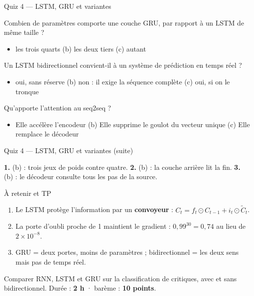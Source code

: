 \begin{frame}{Quiz 4 --- LSTM, GRU et variantes}
\begin{qbox}[Question 1]
Combien de paramètres comporte une couche GRU, par rapport à un LSTM de même
taille ?
\begin{itemize}
  \item[(a)] les trois quarts \quad (b) les deux tiers \quad (c) autant
\end{itemize}
\end{qbox}
\begin{qbox}[Question 2]
Un LSTM bidirectionnel convient-il à un système de prédiction en temps réel ?
\begin{itemize}
  \item[(a)] oui, sans réserve \quad (b) non : il exige la séquence complète
  \quad (c) oui, si on le tronque
\end{itemize}
\end{qbox}
\begin{qbox}[Question 3]
Qu'apporte l'attention au seq2seq ?
\begin{itemize}
  \item[(a)] Elle accélère l'encodeur \quad (b) Elle supprime le goulot du
  vecteur unique \quad (c) Elle remplace le décodeur
\end{itemize}
\end{qbox}

\end{frame}
\begin{frame}{Quiz 4 --- LSTM, GRU et variantes (suite)}
\begin{solbox}[Réponses]
\textbf{1.} (b) : trois jeux de poids contre quatre. \quad
\textbf{2.} (b) : la couche arrière lit la fin. \quad
\textbf{3.} (b) : le décodeur consulte tous les pas de la source.
\end{solbox}
\end{frame}

\begin{frame}{À retenir et TP}
\begin{kbox}
\begin{enumerate}
  \item Le LSTM protège l'information par un \textbf{convoyeur} :
  $C_t = f_t \odot C_{t-1} + i_t \odot \tilde{C}_t$.
  \item La porte d'oubli proche de 1 maintient le gradient : $0{,}99^{30}
  = 0{,}74$ au lieu de $2 \times 10^{-8}$.
  \item GRU = deux portes, moins de paramètres ; bidirectionnel = les deux sens
  mais pas de temps réel.
\end{enumerate}
\end{kbox}
\vspace{1.5mm}
\begin{abox}
Comparer RNN, LSTM et GRU sur la classification de critiques, avec et sans
bidirectionnel. Durée : \textbf{2 h} · barème : \textbf{10 points}.
\end{abox}
\end{frame}
